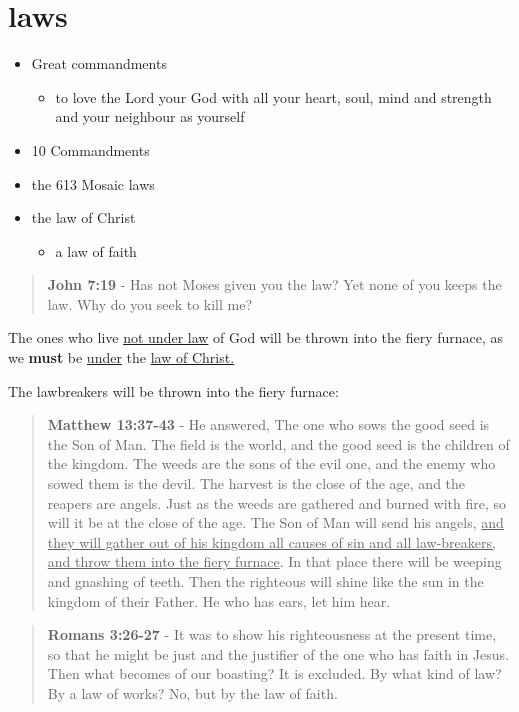 \documentclass[11pt]{article}
\begin{document}
\section{laws}
\label{sec:org6d2279f}
\begin{itemize}
\item Great commandments
\begin{itemize}
\item to love the Lord your God with all your heart, soul, mind and strength and your neighbour as yourself
\end{itemize}
\item 10 Commandments
\item the 613 Mosaic laws
\item the law of Christ
\begin{itemize}
\item a law of faith
\end{itemize}
\end{itemize}

\begin{quote}
\textbf{John 7:19} - Has not Moses given you the law? Yet none of you keeps the law. Why do you seek to kill me?
\end{quote}

The ones who live \uline{not under law} of God will be thrown into the fiery furnace, as we \textbf{must} be \uline{under} the \uline{law of Christ.}

The lawbreakers will be thrown into the fiery furnace:

\begin{quote}
\textbf{Matthew 13:37-43} - He answered, The one who sows the good seed is the Son of Man. The field is the world, and the good seed is the children of the kingdom. The weeds are the sons of the evil one, and the enemy who sowed them is the devil. The harvest is the close of the age, and the reapers are angels. Just as the weeds are gathered and burned with fire, so will it be at the close of the age. The Son of Man will send his angels, \uline{and they will gather out of his kingdom all causes of sin and all law-breakers, and throw them into the fiery furnace}. In that place there will be weeping and gnashing of teeth. Then the righteous will shine like the sun in the kingdom of their Father. He who has ears, let him hear.
\end{quote}

\begin{quote}
\textbf{Romans 3:26-27} - It was to show his righteousness at the present time, so that he might be just and the justifier of the one who has faith in Jesus. Then what becomes of our boasting? It is excluded. By what kind of law? By a law of works? No, but by the law of faith.
\end{quote}
\end{document}
